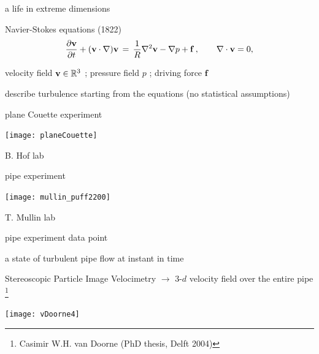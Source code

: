 \begin{frame}{a life in extreme dimensions}
\begin{block}{Navier-Stokes equations (1822)}
\[
\dfrac{\partial {\bf v}}{\partial t} + ({\bf v} \cdot \nabla) {\bf v}
	\,=\,
\frac{1}{R} \nabla ^2 {\bf v}
-\nabla p
+ \mathbf{f}
    \,,\qquad
\nabla \cdot {\bf v} = 0,
\]
\end{block}

\hfill{\small
velocity field  ${\bf v} \in \mathbb{R}^3$
;
pressure field $p$
;
driving force $\mathbf{f}$
        }

\medskip

\begin{block}{describe turbulence}
starting from the equations (no statistical assumptions)
\end{block}

\bigskip

\hfill {\Large\textcolor{red}{}}

\end{frame}

\begin{frame}{plane Couette experiment}
\begin{center}
\texttt{[image: planeCouette]}
\end{center}
B. Hof lab
\end{frame}

\begin{frame}{pipe experiment}
\begin{center}
\texttt{[image: mullin\_puff2200]} %
\end{center}
T. Mullin lab
\end{frame}

\begin{frame}{pipe experiment data point}
\begin{block}{a state of turbulent pipe flow at instant in time}
\end{block}

\bigskip

Stereoscopic Particle Image Velocimetry $\to$
3-$d$ velocity field over the entire pipe%
\footnote{\footnotesize
Casimir W.H. van Doorne
(PhD thesis, Delft  2004)
}

\bigskip

\begin{center}
\texttt{[image: vDoorne4]}
\end{center}
\end{frame}


